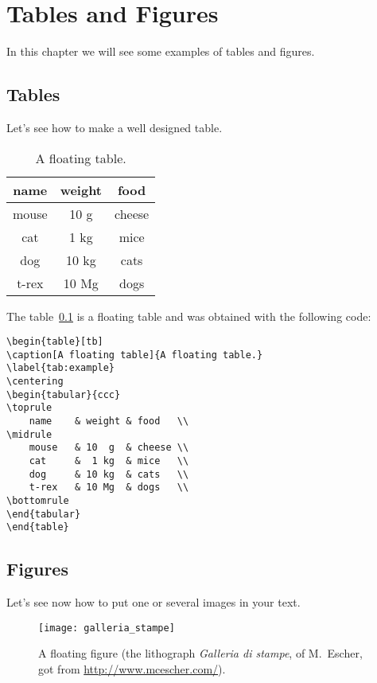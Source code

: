 \chapter*{Tables and Figures}
In this chapter we will see some examples of tables and figures.

\section{Tables}
Let's see how to make a well designed table.

\begin{table}[tb]
\caption[A floating table]{A floating table.}
\label{tab:esempio}
\centering
\begin{tabular}{ccc}
\toprule
name & weight & food \\ 
\midrule
mouse	& 10 g	& cheese \\
cat	& 1 kg	& mice \\
dog	& 10 kg	& cats \\
t-rex	& 10 Mg	& dogs \\
\bottomrule 
\end{tabular}
\end{table}

The table~\ref{tab:esempio} is a floating table and was obtained with the following code:
\begin{lstlisting}
\begin{table}[tb]
\caption[A floating table]{A floating table.}
\label{tab:example}
\centering
\begin{tabular}{ccc}
\toprule
	name 	& weight & food	  \\ 
\midrule
	mouse	& 10  g	 & cheese \\
	cat		&  1 kg	 & mice	  \\
	dog		& 10 kg	 & cats   \\
	t-rex	& 10 Mg	 & dogs	  \\
\bottomrule 
\end{tabular}
\end{table}
\end{lstlisting}



\section{Figures}
Let's see now how to put one or several images in your text.


\begin{figure}[tb] 
\centering 
\texttt{[image: galleria\_stampe]} 
\caption[A floating figure]{A floating figure (the lithograph \emph{Galleria di stampe}, of M.~Escher, got from \url{http://www.mcescher.com/}).}
\label{fig:galleria} 
\end{figure}

